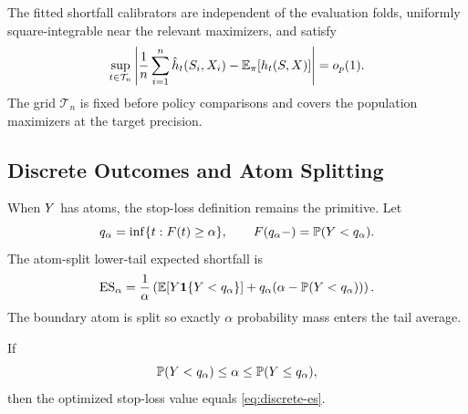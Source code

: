 \begin{twocolproof}
\end{twocolproof}

\begin{assumption}
\label{ass:nuisance}
The fitted shortfall calibrators are independent of the evaluation folds,
uniformly square-integrable near the relevant maximizers, and satisfy
\[
\sup_{t\in\mathcal{T}_n}
\left|
\frac{1}{n}\sum_{i=1}^n \hat h_t(S_i,X_i)
-\mathbb{E}_\pi[h_t(S,X)]
\right|=o_p(1).
\]
The grid $\mathcal{T}_n$ is fixed before policy comparisons and covers the
population maximizers at the target precision.
\end{assumption}

\subsection{Discrete Outcomes and Atom Splitting}
\label{sec:app-discrete}

When $Y$ has atoms, the stop-loss definition remains the primitive. Let
\[
q_\alpha=\inf\{t:F(t)\ge\alpha\},
\qquad
F(q_\alpha-)=\mathbb{P}(Y<q_\alpha).
\]
The atom-split lower-tail expected shortfall is
\begin{equation}
\mathrm{ES}_{\alpha}
=\frac{1}{\alpha}\left(
\mathbb{E}[Y\mathbf{1}\{Y<q_\alpha\}]
+q_\alpha(\alpha-\mathbb{P}(Y<q_\alpha))
\right).
\label{eq:discrete-es}
\end{equation}
The boundary atom is split so exactly $\alpha$ probability mass enters the
tail average.

\begin{proposition}
\label{prop:formal-discrete-stoploss}
If
\[
\mathbb{P}(Y<q_\alpha)\le\alpha\le\mathbb{P}(Y\le q_\alpha),
\]
then the optimized stop-loss value equals \cref{eq:discrete-es}.
\end{proposition}

\begin{twocolproof}
\end{twocolproof}

